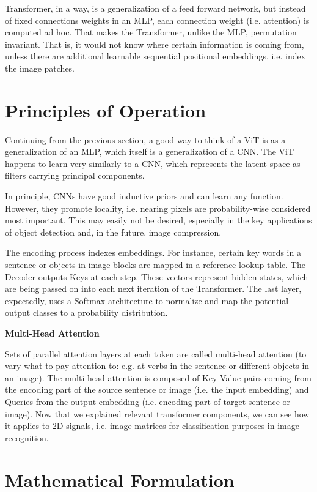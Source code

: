 Transformer, in a way, is a generalization of a feed forward network, but 
instead of fixed connections weights in an MLP, each connection weight (i.e. attention) 
is computed ad hoc. That makes the Transformer, unlike the MLP, permutation invariant. 
That is, it would not know where certain information is coming from, unless there are additional 
learnable sequential positional embeddings, i.e. index the image patches.


\section{Principles of Operation}

Continuing from the previous section, a good way to think of a ViT is as a 
generalization of an MLP, which itself is a generalization of a CNN. 
The ViT happens to learn very similarly to a CNN, which represents the latent space
as filters carrying principal components.

In principle, CNNs have good inductive priors and can learn any function. 
However, they promote locality, i.e. nearing pixels are probability-wise considered most important.
This may easily not be desired, especially in the key applications of object detection and, in the 
future, image compression.


The encoding process indexes embeddings. For instance, certain key words in a sentence or 
objects in image blocks are mapped in a reference lookup table. 
The Decoder outputs Keys at each step. These vectors represent hidden states,
which are being passed on into each next iteration of the Transformer. 
The last layer, expectedly, uses a Softmax architecture to normalize and map the potential output classes 
to a probability distribution. 


\textbf{Multi-Head Attention}


Sets of parallel attention layers at each token are called multi-head attention 
(to vary what to pay attention to: e.g. at verbs in the sentence or different objects 
in an image). The multi-head attention is composed of Key-Value pairs coming from 
the encoding part of the source sentence or image (i.e. the input embedding) and 
Queries from the output embedding (i.e. encoding part of target sentence or image).
Now that we explained relevant transformer components, we can see how it applies to 
2D signals, i.e. image matrices for classification purposes in image recognition.


\section{Mathematical Formulation}

